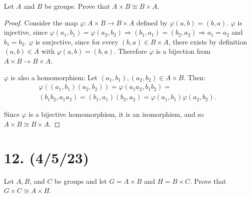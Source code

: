 \documentclass{article}
\begin{document}
Let $A$ and $B$ be groups. Prove that $A \times B \cong B \times A$.

\begin{proof}
    Consider the map $\varphi: A \times B \rightarrow B \times A$ defined by $\varphi(a, b) = (b, a)$. $\varphi$ is injective, since $\varphi(a_1, b_1) = \varphi(a_2, b_2) \Rightarrow (b_1, a_1) = (b_2, a_2) \Rightarrow a_1 = a_2$ and $b_1 = b_2$. $\varphi$ is surjective, since for every $(b, a) \in B \times A$, there exists by definition $(a, b) \in A$ with $\varphi(a, b) = (b, a)$. Therefore $\varphi$ is a bijection from $A \times B \rightarrow B \times A$.

    $\varphi$ is also a homomorphism: Let $(a_1, b_1), (a_2, b_2) \in A \times B$. Then:
    \begin{multline*}
        \varphi((a_1, b_1)(a_2, b_2)) = \varphi(a_1 a_2, b_1 b_2) = \\ 
        (b_1 b_2, a_1 a_2) = (b_1, a_1)(b_2, a_2) = \varphi(a_1, b_1) \varphi(a_2, b_2).
    \end{multline*}

    Since $\varphi$ is a bijective homomorphism, it is an isomorphism, and so $A \times B \cong B \times A$.
\end{proof}

\section*{12. (4/5/23)}

Let $A, B$, and $C$ be groups and let $G = A \times B$ and $H = B \times C$. Prove that $G \times C \cong A \times H$.
\end{document}
